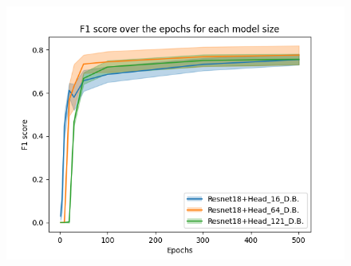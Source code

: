 \begin{figure}[!htbp]
\begin{minipage}[t]{.5\textwidth}
      \label{fig:resnet18+head_recall_4_nb_db}
    \end{minipage}
\end{figure}

\begin{figure}[!htbp]
    \centering
    \begin{minipage}[t]{.5\textwidth}%
      \centering
      \includegraphics[width=1.1\linewidth]{Figures/results/resnet18+head/resnet18+head_f1_score_4_nb_db.png}
      \label{fig:resnet18+head_f1_score_4_nb_db}
    \end{minipage}%
\end{figure}

